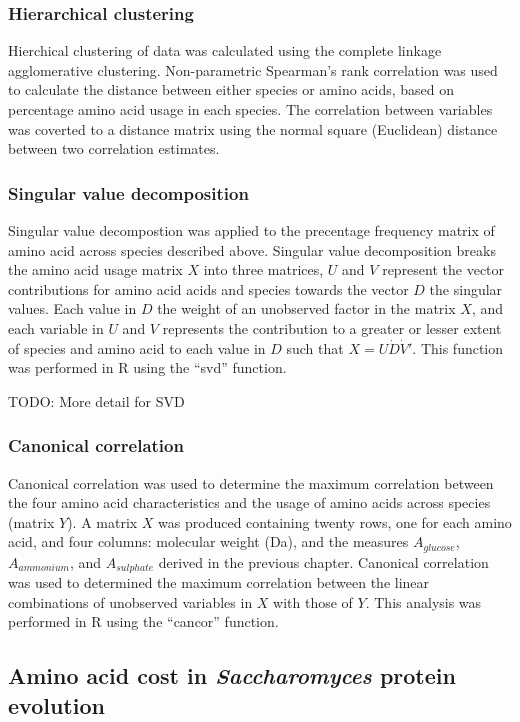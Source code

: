 \subsubsection{Hierarchical clustering}

Hierchical clustering of data was calculated using the complete linkage agglomerative clustering. Non-parametric Spearman's rank correlation was used to calculate the distance between either species or amino acids, based on percentage amino acid usage in each species. The correlation between variables was coverted to a distance matrix using the normal square (Euclidean) distance between two correlation estimates.

\subsubsection{Singular value decomposition}
 
Singular value decompostion was applied to the precentage frequency matrix of amino acid across species described above. Singular value decomposition breaks the amino acid usage matrix $X$ into three matrices, $U$ and $V$ represent the vector contributions for amino acid acids and species towards the vector $D$ the singular values. Each value in $D$ the weight of an unobserved factor in the matrix $X$, and each variable in $U$ and $V$  represents the contribution to a greater or lesser extent of species and amino acid to each value in $D$ such that $X = U \dot D \dot V'$. This function was performed in R using the ``svd'' function.

TODO: More detail for SVD

\subsubsection{Canonical correlation}

Canonical correlation was used to determine the maximum correlation between the four amino acid characteristics and the usage of amino acids across species (matrix $Y$). A matrix $X$ was produced containing twenty rows, one for each amino acid, and four columns: molecular weight (Da), and the measures $A_{glucose}$, $A_{ammonium}$, and $A_{sulphate}$ derived in the previous chapter. Canonical correlation was used to determined the maximum correlation between the linear combinations of unobserved variables in $X$ with those of $Y$. This analysis was performed in R using the ``cancor'' function.

\subsection{Amino acid cost in \emph{Saccharomyces} protein evolution}

